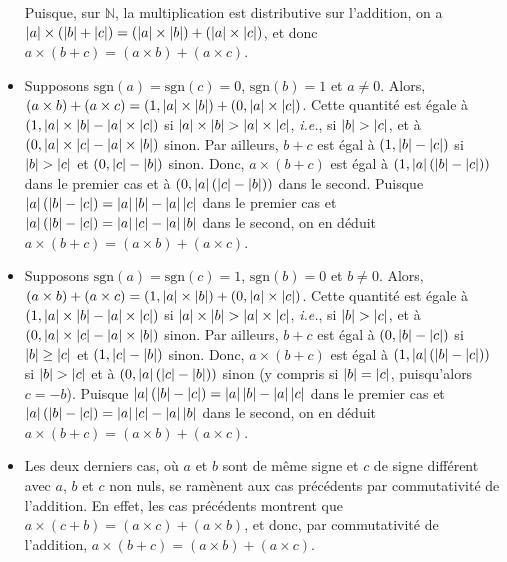 \begin{itemize}[nosep]
        Puisque, sur $\mathbb{N}$, la multiplication est distributive sur l'addition, on a $\abs{a} \times (\abs{b} + \abs{c}) = (\abs{a} \times \abs{b}) + (\abs{a} \times \abs{c})$, et donc $a \times (b + c) = (a \times b) + (a \times c)$.
    \item Supposons $\mathrm{sgn}(a) = \mathrm{sgn}(c) = 0$, $\mathrm{sgn}(b) = 1$ et $a \neq 0$. 
        Alors, $(a \times b) + (a \times c) = (1, \abs{a} \times \abs{b}) + (0, \abs{a} \times \abs{c})$. 
        Cette quantité est égale à $(1, \abs{a} \times \abs{b} - \abs{a} \times \abs{c})$ si $\abs{a} \times \abs{b} > \abs{a} \times \abs{c}$, \textit{i.e.}, si $\abs{b} > \abs{c}$, et à $(0, \abs{a} \times \abs{c} - \abs{a} \times \abs{b})$ sinon.
        Par ailleurs, $b + c$ est égal à $(1, \abs{b} - \abs{c})$ si $\abs{b} > \abs{c}$ et $(0, \abs{c} - \abs{b})$ sinon.
        Donc, $a \times (b + c)$ est égal à $(1, \abs{a} (\abs{b} - \abs{c}))$ dans le premier cas et à $(0, \abs{a} (\abs{c} - \abs{b}))$ dans le second.
        Puisque $\abs{a} (\abs{b} - \abs{c}) = \abs{a} \abs{b} - \abs{a} \abs{c}$ dans le premier cas et $\abs{a} (\abs{b} - \abs{c}) = \abs{a} \abs{c} - \abs{a} \abs{b}$ dans le second, on en déduit $a \times (b + c) = (a \times b) + (a \times c)$.
    \item Supposons $\mathrm{sgn}(a) = \mathrm{sgn}(c) = 1$, $\mathrm{sgn}(b) = 0$ et $b \neq 0$. 
        Alors, $(a \times b) + (a \times c) = (1, \abs{a} \times \abs{b}) + (0, \abs{a} \times \abs{c})$. 
        Cette quantité est égale à $(1, \abs{a} \times \abs{b} - \abs{a} \times \abs{c})$ si $\abs{a} \times \abs{b} > \abs{a} \times \abs{c}$, \textit{i.e.}, si $\abs{b} > \abs{c}$, et à $(0, \abs{a} \times \abs{c} - \abs{a} \times \abs{b})$ sinon.
        Par ailleurs, $b + c$ est égal à $(0, \abs{b} - \abs{c})$ si $\abs{b} \geq \abs{c}$ et $(1, \abs{c} - \abs{b})$ sinon.
        Donc, $a \times (b + c)$ est égal à $(1, \abs{a} (\abs{b} - \abs{c}))$ si $\abs{b} > \abs{c}$ et à $(0, \abs{a} (\abs{c} - \abs{b}))$ sinon (y compris si $\abs{b} = \abs{c}$, puisqu'alors $c = -b$).
        Puisque $\abs{a} (\abs{b} - \abs{c}) = \abs{a} \abs{b} - \abs{a} \abs{c}$ dans le premier cas et $\abs{a} (\abs{b} - \abs{c}) = \abs{a} \abs{c} - \abs{a} \abs{b}$ dans le second, on en déduit $a \times (b + c) = (a \times b) + (a \times c)$.
    \item Les deux derniers cas, où $a$ et $b$ sont de même signe et $c$ de signe différent avec $a$, $b$ et $c$ non nuls, se ramènent aux cas précédents par commutativité de l'addition.
        En effet, les cas précédents montrent que $a \times (c + b) = (a \times c) + (a \times b)$, et donc, par commutativité de l'addition, $a \times (b + c) = (a \times b) + (a \times c)$.
\end{itemize}

